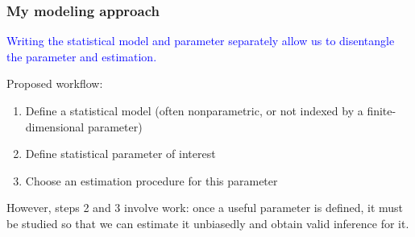 \documentclass[12pt, 
hyperref={colorlinks=true, linkcolor=blue, urlcolor=cyan},dvipsnames]{beamer}
\begin{document}
\begin{frame}
\frametitle{My modeling approach}
\textcolor{blue}{Writing the statistical model and parameter separately allow us to disentangle the parameter and estimation.}

Proposed workflow:
\begin{enumerate}
\item Define a statistical model (often nonparametric, or not indexed by a finite-dimensional parameter)
\item Define statistical parameter of interest
\item Choose an estimation procedure for this parameter
\end{enumerate}

However, steps 2 and 3 involve work: once a useful parameter is defined, it must be studied so that we can estimate it unbiasedly and obtain valid inference for it.
\end{frame}
\end{document}
